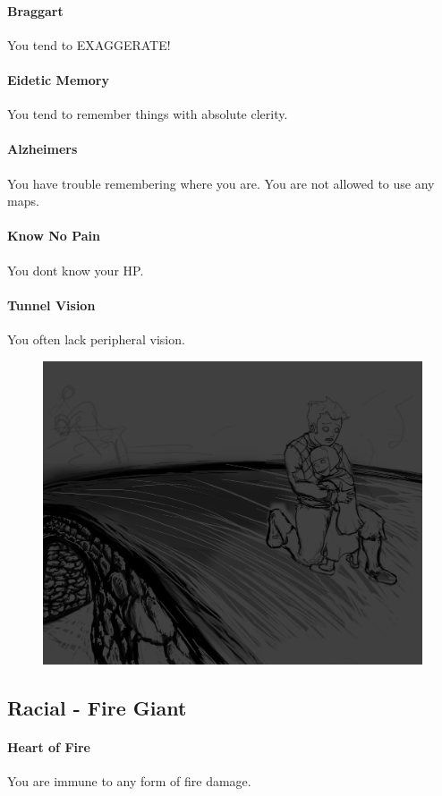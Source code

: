     \paragraph{Braggart} You tend to EXAGGERATE!
    \paragraph{Eidetic Memory} You tend to remember things with absolute clerity.
    \paragraph{Alzheimers} You have trouble remembering where you are. You are not allowed to use any maps.
    \paragraph{Know No Pain} You dont know your HP. 
    \paragraph{Tunnel Vision} You often lack peripheral vision. 
    \begin{figure}[h]
\includegraphics[width=\columnwidth]{rakaarth4}
\end{figure}
\subsection{Racial - Fire Giant}
    \paragraph{Heart of Fire} You are immune to any form of fire damage.
